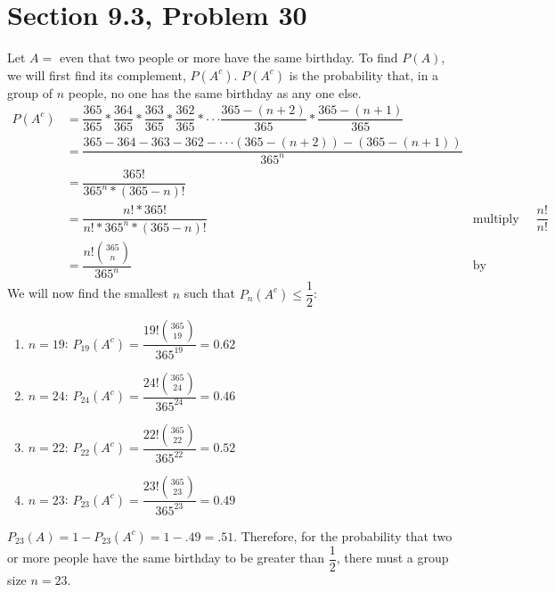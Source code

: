 \documentclass{article}
\begin{document}
\clearpage
\header

\section*{Section 9.3, Problem 30}

Let $A=$ even that two people or more have the same birthday. To find $P(A)$, we will first find its complement, $P(A^c)$. $P(A^c)$ is the probability that, in a group of $n$ people, no one has the same birthday as any one else.
\begin{align*}
	P(A^c) &= \dfrac{365}{365} * \dfrac{364}{365} * \dfrac{363}{365} * \dfrac{362}{365} * \cdot \cdot \cdot \dfrac{365-(n+2)}{365} *\dfrac{365-(n+1)}{365} \\
	&= \dfrac{365-364-363-362- \cdot \cdot \cdot (365-(n+2)) - (365-(n+1))}{365^n} \\
	&= \dfrac{365!}{365^n * (365-n)!} \\
	&= \dfrac{n!*365!}{n! * 365^n * (365-n)!}	& \text{multiply by } \dfrac{n!}{n!} \\
	&= \dfrac{n! \binom{365}{n}}{365^n} & \text{by definition of binomial theorem}
\end{align*}
We will now find the smallest $n$ such that $P_n(A^c) \leq \dfrac{1}{2}$:
\begin{enumerate}
	\item $n=19$: $P_{19}(A^c) = \dfrac{19! \binom{365}{19}}{365^19} = 0.62$
	\item $n=24$: $P_{24}(A^c) = \dfrac{24! \binom{365}{24}}{365^24} = 0.46$
	\item $n=22$: $P_{22}(A^c) = \dfrac{22! \binom{365}{22}}{365^22} = 0.52$
	\item $n=23$: $P_{23}(A^c) = \dfrac{23! \binom{365}{23}}{365^23} = 0.49$
\end{enumerate}
$P_{23}(A) = 1 - P_{23}(A^c) = 1- .49 = .51$. Therefore, for the probability that two or more people have the same birthday to be greater than $\dfrac{1}{2}$, there must a group size $n=23$.

\clearpage
\header
\end{document}
